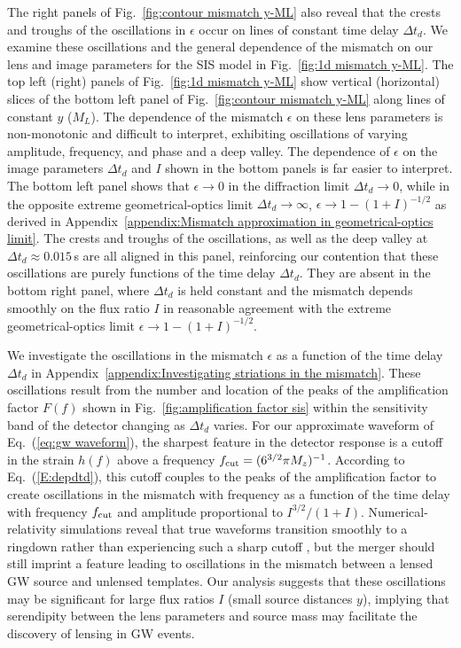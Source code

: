 \documentclass[floats,floatfix,showpacs,amssymb,prd,twocolumn,superscriptaddress,nofootinbib,nolongbibliography,reprint]{revtex4-2}
\begin{document}
The right panels of Fig.~\ref{fig:contour mismatch y-ML} also reveal that the crests and troughs of the oscillations in $\epsilon$ occur on lines of constant time delay $\Delta t_d$.  We examine these oscillations and the general dependence of the mismatch on our lens and image parameters for the SIS model in Fig.~\ref{fig:1d mismatch y-ML}.  The top left (right) panels of Fig.~\ref{fig:1d mismatch y-ML} show vertical (horizontal) slices of the bottom left panel of Fig.~\ref{fig:contour mismatch y-ML} along lines of constant $y$ ($M_L$).  The dependence of the mismatch $\epsilon$ on these lens parameters is non-monotonic and difficult to interpret, exhibiting oscillations of varying amplitude, frequency, and phase and a deep valley.  The dependence of $\epsilon$ on the image parameters $\Delta t_d$ and $I$ shown in the bottom panels is far easier to interpret.  The bottom left panel shows that $\epsilon \to 0$ in the diffraction limit $\Delta t_d \to 0$, while in the opposite extreme geometrical-optics limit $\Delta t_d \to \infty$, $\epsilon \to 1 - (1 + I)^{-1/2}$ as derived in Appendix~\ref{appendix:Mismatch approximation in geometrical-optics limit}.  The crests and troughs of the oscillations, as well as the deep valley at $\Delta t_d \approx 0.015$\,s are all aligned in this panel, reinforcing our contention that these oscillations are purely functions of the time delay $\Delta t_d$.  They are absent in the bottom right panel, where $\Delta t_d$ is held constant and the mismatch depends smoothly on the flux ratio $I$ in reasonable agreement with the extreme geometrical-optics limit $\epsilon \to 1 - (1 + I)^{-1/2}$.

We investigate the oscillations in the mismatch $\epsilon$ as a function of the time delay $\Delta t_d$ in Appendix~\ref{appendix:Investigating striations in the mismatch}.  These oscillations result from the number and location of the peaks of the amplification factor $F(f)$ shown in Fig.~\ref{fig:amplification factor sis} within the sensitivity band of the detector changing as  $\Delta t_d$ varies.  For our approximate waveform of Eq.~(\ref{eq:gw waveform}), the sharpest feature in the detector response is a cutoff in the strain $h(f)$ above a frequency $f_{\rm cut} = (6^{3/2}\pi M_z)^{-1}$.  According to Eq.~(\ref{E:depdtd}), this cutoff couples to the peaks of the amplification factor to create oscillations in the mismatch with frequency as a function of the time delay with frequency $f_{\rm cut}$ and amplitude proportional to $I^{3/2}/(1+I)$.  Numerical-relativity simulations reveal that true waveforms transition smoothly to a ringdown rather than experiencing such a sharp cutoff \cite{Mroue:2013xna, LIGOScientific:2014oec, Boyle:2019kee}, but the merger should still imprint a feature leading to oscillations in the mismatch between a lensed GW source and unlensed templates.  Our analysis suggests that these oscillations may be significant for large flux ratios $I$ (small source distances $y$), implying that serendipity between the lens parameters and source mass may facilitate the discovery of lensing in GW events.
\end{document}
